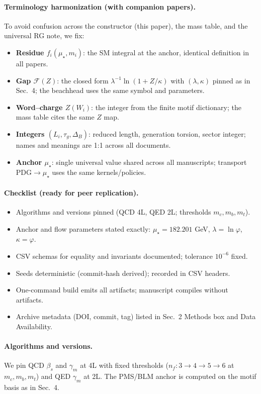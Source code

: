 \documentclass[epjc3]{svjour3}
\begin{document}
\paragraph{Terminology harmonization (with companion papers).}
To avoid confusion across the constructor (this paper), the mass table, and the universal RG note, we fix:
\begin{itemize}
  \item \textbf{Residue $f_i(\mu_\star,m_i)$}: the SM integral at the anchor, identical definition in all papers.
  \item \textbf{Gap $\mathcal F(Z)$}: the closed form $\lambda^{-1}\ln(1+Z/\kappa)$ with $(\lambda,\kappa)$ pinned as in Sec.~4; the beachhead uses the same symbol and parameters.
  \item \textbf{Word--charge $Z(W_i)$}: the integer from the finite motif dictionary; the mass table cites the same $Z$ map.
  \item \textbf{Integers $(L_i,\tau_g,\Delta_B)$}: reduced length, generation torsion, sector integer; names and meanings are 1:1 across all documents.
  \item \textbf{Anchor $\mu_\star$}: single universal value shared across all manuscripts; transport PDG$\to\mu_\star$ uses the same kernels/policies.
\end{itemize}

\paragraph{Checklist (ready for peer replication).}
\begin{itemize}
  \item Algorithms and versions pinned (QCD 4L, QED 2L; thresholds $m_c,m_b,m_t$).
  \item Anchor and flow parameters stated exactly: $\mu_\star=182.201$ GeV, $\lambda=\ln\varphi$, $\kappa=\varphi$.
  \item CSV schemas for equality and invariants documented; tolerance $10^{-6}$ fixed.
  \item Seeds deterministic (commit-hash derived); recorded in CSV headers.
  \item One-command build emits all artifacts; manuscript compiles without artifacts.
  \item Archive metadata (DOI, commit, tag) listed in Sec.~2 Methods box and Data Availability.
\end{itemize}

\paragraph{Algorithms and versions.}
We pin QCD $\beta_s$ and $\gamma_m$ at 4L with fixed thresholds ($n_f:3\to4\to5\to6$ at $m_c,m_b,m_t$) and QED $\gamma_m$ at 2L. The PMS/BLM anchor is computed on the motif basis as in Sec.~4.
\end{document}
